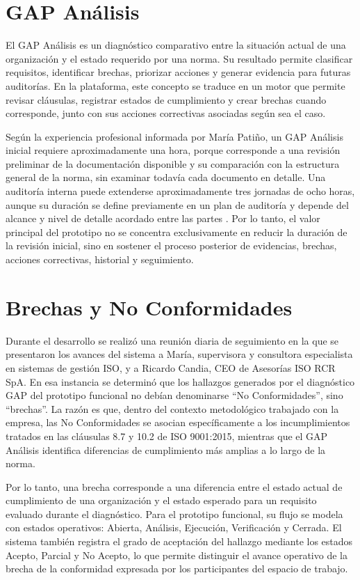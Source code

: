 \documentclass[final]{udpthesis}
\begin{document}
\section{GAP Análisis}

El GAP Análisis es un diagnóstico comparativo entre la situación actual de una organización y el estado requerido por una norma. Su resultado permite clasificar requisitos, identificar brechas, priorizar acciones y generar evidencia para futuras auditorías. En la plataforma, este concepto se traduce en un motor que permite revisar cláusulas, registrar estados de cumplimiento y crear brechas cuando corresponde, junto con sus acciones correctivas asociadas según sea el caso.

Según la experiencia profesional informada por María Patiño, un GAP Análisis inicial requiere aproximadamente una hora, porque corresponde a una revisión preliminar de la documentación disponible y su comparación con la estructura general de la norma, sin examinar todavía cada documento en detalle. Una auditoría interna puede extenderse aproximadamente tres jornadas de ocho horas, aunque su duración se define previamente en un plan de auditoría y depende del alcance y nivel de detalle acordado entre las partes \cite{entrevista-whatsapp-maria}. Por lo tanto, el valor principal del prototipo no se concentra exclusivamente en reducir la duración de la revisión inicial, sino en sostener el proceso posterior de evidencias, brechas, acciones correctivas, historial y seguimiento.

\section{Brechas y No Conformidades}

Durante el desarrollo se realizó una reunión diaria de seguimiento en la que se presentaron los avances del sistema a María, supervisora y consultora especialista en sistemas de gestión ISO, y a Ricardo Candia, CEO de Asesorías ISO RCR SpA. En esa instancia se determinó que los hallazgos generados por el diagnóstico GAP del prototipo funcional no debían denominarse ``No Conformidades'', sino ``brechas''. La razón es que, dentro del contexto metodológico trabajado con la empresa, las No Conformidades se asocian específicamente a los incumplimientos tratados en las cláusulas 8.7 y 10.2 de ISO 9001:2015, mientras que el GAP Análisis identifica diferencias de cumplimiento más amplias a lo largo de la norma.

Por lo tanto, una brecha corresponde a una diferencia entre el estado actual de cumplimiento de una organización y el estado esperado para un requisito evaluado durante el diagnóstico. Para el prototipo funcional, su flujo se modela con estados operativos: Abierta, Análisis, Ejecución, Verificación y Cerrada. El sistema también registra el grado de aceptación del hallazgo mediante los estados Acepto, Parcial y No Acepto, lo que permite distinguir el avance operativo de la brecha de la conformidad expresada por los participantes del espacio de trabajo.
\end{document}
